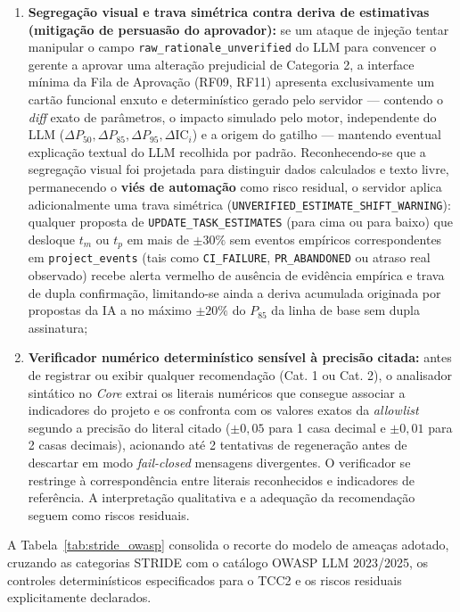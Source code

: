 \documentclass[12pt,openany,oneside,a4paper,english,brazilian,sumario=tradicional]{abntex2}
\newcommand{\IC}{\mathrm{IC}}
\begin{document}
\begin{enumerate}
  \item \textbf{Segregação visual e trava simétrica contra deriva de estimativas (mitigação de persuasão do aprovador):} se um ataque de injeção tentar manipular o campo \texttt{raw\_\allowbreak rationale\_\allowbreak unverified} do LLM para convencer o gerente a aprovar uma alteração prejudicial de Categoria 2, a interface mínima da Fila de Aprovação (RF09, RF11) apresenta exclusivamente um cartão funcional enxuto e determinístico gerado pelo servidor --- contendo o \textit{diff} exato de parâmetros, o impacto simulado pelo motor, independente do LLM ($\Delta P_{50}, \Delta P_{85}, \Delta P_{95}, \Delta\IC_i$) e a origem do gatilho --- mantendo eventual explicação textual do LLM recolhida por padrão. Reconhecendo-se que a segregação visual foi projetada para distinguir dados calculados e texto livre, permanecendo o \textbf{viés de automação} como risco residual, o servidor aplica adicionalmente uma trava simétrica (\texttt{UNVERIFIED\_\allowbreak ESTIMATE\_\allowbreak SHIFT\_\allowbreak WARNING}): qualquer proposta de \texttt{UPDATE\_\allowbreak TASK\_\allowbreak ESTIMATES} (para cima ou para baixo) que desloque $t_m$ ou $t_p$ em mais de $\pm 30\%$ sem eventos empíricos correspondentes em \texttt{project\_\allowbreak events} (tais como \texttt{CI\_\allowbreak FAILURE}, \texttt{PR\_\allowbreak ABANDONED} ou atraso real observado) recebe alerta vermelho de ausência de evidência empírica e trava de dupla confirmação, limitando-se ainda a deriva acumulada originada por propostas da IA a no máximo $\pm 20\%$ do $P_{85}$ da linha de base sem dupla assinatura;
  \item \textbf{Verificador numérico determinístico sensível à precisão citada:} antes de registrar ou exibir qualquer recomendação (Cat. 1 ou Cat. 2), o analisador sintático no \textit{Core} extrai os literais numéricos que consegue associar a indicadores do projeto e os confronta com os valores exatos da \textit{allowlist} segundo a precisão do literal citado ($\pm 0{,}05$ para 1 casa decimal e $\pm 0{,}01$ para 2 casas decimais), acionando até 2 tentativas de regeneração antes de descartar em modo \textit{fail-closed} mensagens divergentes. O verificador se restringe à correspondência entre literais reconhecidos e indicadores de referência. A interpretação qualitativa e a adequação da recomendação seguem como riscos residuais.
\end{enumerate}

A Tabela~\ref{tab:stride_owasp} consolida o recorte do modelo de ameaças adotado, cruzando as categorias STRIDE com o catálogo OWASP LLM 2023/2025, os controles determinísticos especificados para o TCC2 e os riscos residuais explicitamente declarados.
\end{document}
